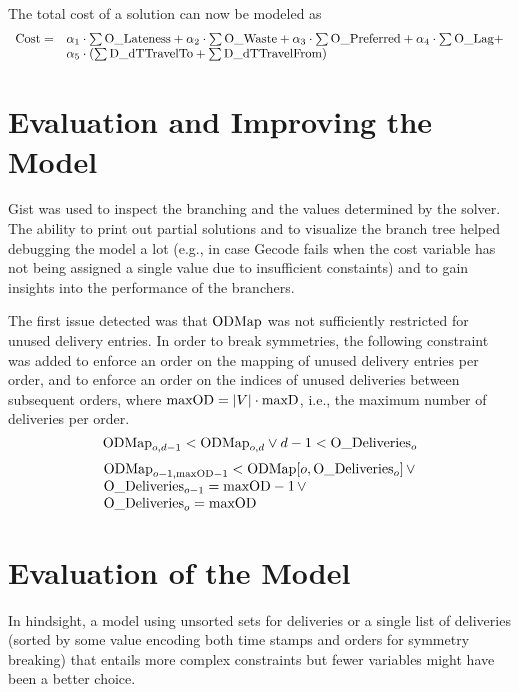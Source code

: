 \documentclass[a4paper]{article}
\begin{document}
The total cost of a solution can now be modeled as
\[
\begin{array}{l l}
\text{Cost} = & \alpha_1 \cdot \sum \text{O\_Lateness} + \alpha_2 \cdot \sum \text{O\_Waste} + \alpha_3 \cdot \sum \text{O\_Preferred} + \alpha_4 \cdot \sum \text{O\_Lag} + \\
              & \alpha_5 \cdot (\sum \text{D\_dTTravelTo} + \sum \text{D\_dTTravelFrom})
\end{array}
\]


\section{Evaluation and Improving the Model}

Gist was used to inspect the branching and the values determined by the solver. The ability to print out partial
solutions and to visualize the branch tree helped debugging the model a lot (e.g., in case Gecode fails when the cost
variable has not being assigned a single value due to insufficient constaints) and to gain insights into the performance of
the branchers.

\newcommand{\maxOD}{\text{maxOD}}

The first issue detected was that $\text{ODMap}$ was not sufficiently restricted for unused delivery entries. In order to break symmetries, the following constraint
was added to enforce an order on the mapping of unused delivery entries per order, and to enforce an order on the
indices of unused deliveries between subsequent orders, where $\maxOD = |V| \cdot \maxD$, i.e., the maximum number
of deliveries per order.
\[
\text{ODMap}_{o,d-1} < \text{ODMap}_{o,d} \vee d-1 < \text{O\_Deliveries}_o
\]
\[
\begin{array}{l}
\ODMap_{o-1,\maxOD - 1} < \ODMap[o, \ODeliveries_o] \, \vee \\
\ODeliveries_{o-1} = \maxOD - 1 \, \vee \\
\ODeliveries_o = \maxOD
\end{array}
\]




\section{Evaluation of the Model}


In hindsight, a model using unsorted sets for deliveries or a single list of deliveries (sorted by some value encoding
both time stamps and orders for symmetry breaking) that entails more complex constraints but fewer variables might have
been a better choice.


%
\end{document}
